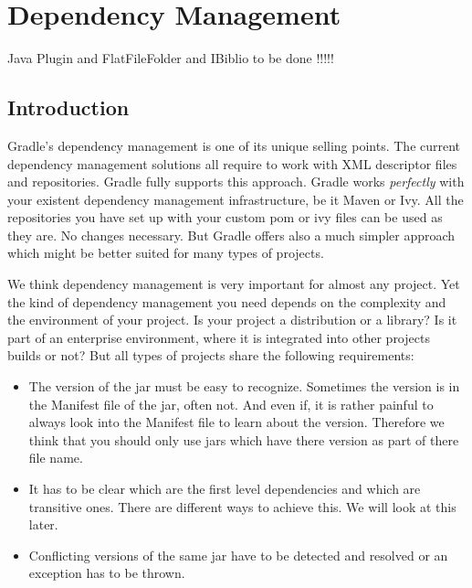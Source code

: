 \chapter{Dependency Management}
Java Plugin and FlatFileFolder and IBiblio to be done !!!!!
\section{Introduction} %
\label{sec:Introduction}
Gradle's dependency management is one of its unique selling points. The current dependency management solutions all require to work with XML descriptor files and repositories. Gradle fully supports this approach. Gradle works \emph{perfectly} with your existent dependency management infrastructure, be it Maven or Ivy. All the repositories you have set up with your custom pom or ivy files can be used as they are. No changes necessary. But Gradle offers also a much simpler approach which might be better suited for many types of projects. 

We think dependency management is very important for almost any project. Yet the kind of dependency management you need depends on the complexity and the environment of your project. Is your project a distribution or a library? Is it part of an enterprise environment, where it is integrated into other projects builds or not? But all types of projects share the following requirements:
\begin{itemize}
\item The version of the jar must be easy to recognize. Sometimes the version is in the Manifest file of the jar, often not. And even if, it is rather painful to always look into the Manifest file to learn about the version. Therefore we think that you should only use jars which have there version as part of there file name.
\item It has to be clear which are the first level dependencies and which are transitive ones. There are different ways to achieve this. We will look at this later.
\item Conflicting versions of the same jar have to be detected and resolved or an exception has to be thrown.
\end{itemize}

